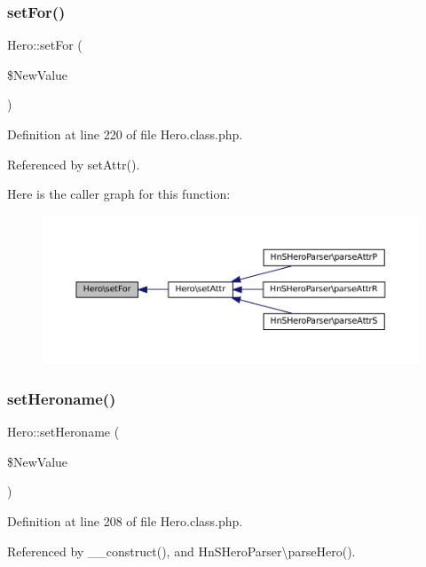 \subsubsection{\texorpdfstring{set\+For()}{setFor()}}
{\footnotesize\ttfamily Hero\+::set\+For (\begin{DoxyParamCaption}\item[{}]{\$\+New\+Value }\end{DoxyParamCaption})}



Definition at line 220 of file Hero.\+class.\+php.



Referenced by set\+Attr().

Here is the caller graph for this function\+:\nopagebreak
\begin{figure}[H]
\begin{center}
\leavevmode
\includegraphics[width=350pt]{class_hero_a4ecce0522ff9c6eb513531a05d7fea8a_icgraph}
\end{center}
\end{figure}
\mbox{\label{class_hero_a10da7e23d594023bf7f2508bb41db1dd}} 
\subsubsection{\texorpdfstring{set\+Heroname()}{setHeroname()}}
{\footnotesize\ttfamily Hero\+::set\+Heroname (\begin{DoxyParamCaption}\item[{}]{\$\+New\+Value }\end{DoxyParamCaption})}



Definition at line 208 of file Hero.\+class.\+php.



Referenced by \+\_\+\+\_\+construct(), and Hn\+S\+Hero\+Parser\textbackslash{}parse\+Hero().


